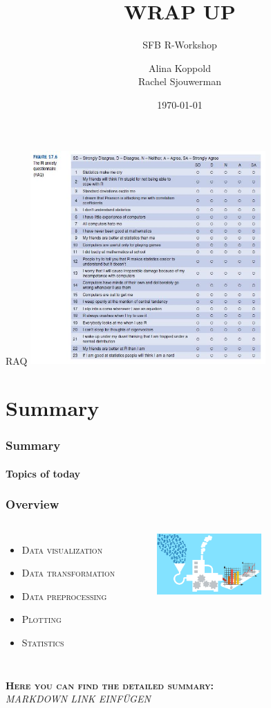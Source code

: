 \documentclass{beamer}
\title{WRAP UP}
\subtitle{SFB R-Workshop}
\author{Alina Koppold \\ Rachel Sjouwerman}
\date{\tiny{\today}}
\institute{\url{a.koppold@uke.de}\\ \url{r.sjouwerman@uke.de}}
\begin{document}
\begin{frame}[plain,t]
\titlepage
\end{frame}

\begin{frame}{RAQ}
\includegraphics[width = 9cm]{RAQ_R_anxiety_quest.JPG}
\end{frame}



\section{Summary}
\begin{frame}
\frametitle{Summary}
\framesubtitle{Topics of today}
\frametitle{Overview}

\begin{columns} 
    \begin{itemize}
    \item \textsc{Data visualization}
    \item \textsc{Data transformation }
    \item \textsc{Data preprocessing}
    \item \textsc{Plotting }
    \item \textsc{Statistics}
    \end{itemize} 
     \begin{figure}
    \includegraphics[width =4cm]{data_processing.jpg}
    \vspace{3cm}
    \end{figure}
    \end{columns} 
\vspace{-2cm}
\textsc{\textbf{Here you can find the detailed summary:}}\\
\textit{MARKDOWN LINK EINFÜGEN}
\end{frame}
\end{document}
